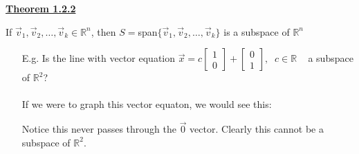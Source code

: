 \documentclass{letter}
\newcommand{\0}[1]{\begin{bmatrix}#1\end{bmatrix}}
\newcommand{\h}[1]{\underline{\textbf{#1}}}
\begin{document}
	\h{Theorem 1.2.2}
	
	If $\vec v_1, \vec v_2, \dots, \vec v_k \in \mathbb{R}^n$, then $S = $span$\{ \vec v_1, \vec v_2, \dots, \vec v_k \}$ is a subspace of $\mathbb{R}^n$
	
	\begin{itemize}
		\item[E.g.] Is the line with vector equation $\vec x = c\0{1\\0} + \0{0\\1},\;\;c \in \mathbb{R}\;\;\;$ a subspace of $\mathbb{R}^2$?\\\\
		If we were to graph this vector equaton, we would see this:
		
		\begin{center}
		\end{center}
		Notice this never passes through the $\vec 0$ vector. Clearly this cannot be a subspace of $\mathbb{R}^2$.
	\end{itemize}
\end{document}
